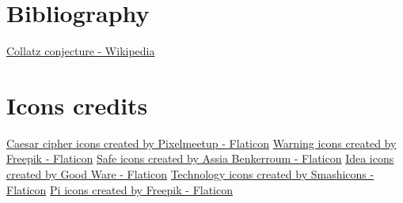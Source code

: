 \documentclass{article}
\begin{document}
\newpage
\tableofcontents
\newpage








\section{Bibliography}

\href{https://en.wikipedia.org/wiki/Collatz_conjecture}{Collatz conjecture - Wikipedia}


\section{Icons credits}

\href{https://www.flaticon.com/free-icons/caesar-cipher}{Caesar cipher icons created by Pixelmeetup - Flaticon}
\newline
\href{https://www.flaticon.com/free-icons/warning}{Warning icons created by Freepik - Flaticon}
\newline
\href{https://www.flaticon.com/free-icons/safe}{Safe icons created by Assia Benkerroum  - Flaticon}
\newline
\href{https://www.flaticon.com/free-icons/idea}{Idea icons created by Good Ware - Flaticon}
\newline
\href{https://www.flaticon.com/free-icons/technology}{Technology icons created by Smashicons - Flaticon}
\newline
\href{https://www.flaticon.com/free-icons/pi}{Pi icons created by Freepik - Flaticon}
\end{document}
